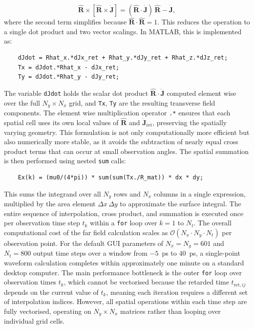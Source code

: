 \documentclass[12pt]{final_project_report}
\begin{document}
\begin{equation}
    \hat{\mathbf{R}} \times [\hat{\mathbf{R}} \times \dot{\mathbf{J}}] = (\hat{\mathbf{R}} \cdot \dot{\mathbf{J}})\,\hat{\mathbf{R}} - \dot{\mathbf{J}},
\end{equation}
where the second term simplifies because $\hat{\mathbf{R}} \cdot \hat{\mathbf{R}} = 1$. This reduces the operation to a single dot product and two vector scalings. In MATLAB, this is implemented as:
\begin{verbatim}
    dJdot = Rhat_x.*dJx_ret + Rhat_y.*dJy_ret + Rhat_z.*dJz_ret;
    Tx = dJdot.*Rhat_x - dJx_ret;
    Ty = dJdot.*Rhat_y - dJy_ret;
\end{verbatim}
The variable \texttt{dJdot} holds the scalar dot product $\hat{\mathbf{R}} \cdot \dot{\mathbf{J}}$ computed element wise over the full $N_y \times N_x$ grid, and \texttt{Tx}, \texttt{Ty} are the resulting transverse field components. The element wise multiplication operator \texttt{.*} ensures that each spatial cell uses its own local values of $\hat{\mathbf{R}}$ and $\dot{\mathbf{J}}_{\mathrm{ret}}$, preserving the spatially varying geometry. This formulation is not only computationally more efficient but also numerically more stable, as it avoids the subtraction of nearly equal cross product terms that can occur at small observation angles. The spatial summation is then performed using nested \texttt{sum} calls:
\begin{verbatim}
    Ex(k) = (mu0/(4*pi)) * sum(sum(Tx./R_mat)) * dx * dy;
\end{verbatim}
This sums the integrand over all $N_y$ rows and $N_x$ columns in a single expression, multiplied by the area element $\Delta x\,\Delta y$ to approximate the surface integral. The entire sequence of interpolation, cross product, and summation is executed once per observation time step $t_k$ within a \texttt{for} loop over $k = 1$ to $N_t$.\newline
The overall computational cost of the far field calculation scales as $\mathcal{O}(N_x \cdot N_y \cdot N_t)$ per observation point. For the default GUI parameters of $N_x = N_y = 601$ and $N_t = 800$ output time steps over a window from $-5$~ps to $40$~ps, a single-point waveform calculation completes within approximately one minute on a standard desktop computer. The main performance bottleneck is the outer \texttt{for} loop over observation times $t_k$, which cannot be vectorised because the retarded time $t_{\mathrm{ret},ij}$ depends on the current value of $t_k$, meaning each iteration requires a different set of interpolation indices. However, all spatial operations within each time step are fully vectorised, operating on $N_y \times N_x$ matrices rather than looping over individual grid cells.\newline
\end{document}
